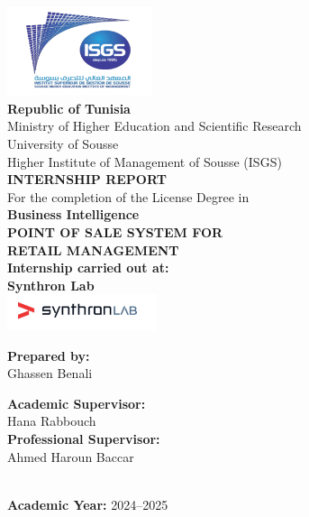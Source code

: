 \begin{titlepage}
    \begin{center}

        \vspace*{1em}
        \includegraphics[width=0.32\textwidth]{figures/logos/isgs-logo.png}\\[2em]

        \textbf{\large Republic of Tunisia}\\
        Ministry of Higher Education and Scientific Research\\
        University of Sousse\\
        Higher Institute of Management of Sousse (ISGS)\\[3em]

        \textbf{\Large INTERNSHIP REPORT}\\[1em]
        For the completion of the License Degree in\\
        \textbf{Business Intelligence}\\[2.5em]

        {\huge \textbf{POINT OF SALE SYSTEM FOR}}\\[0.3em]
        
        {\huge \textbf{RETAIL MANAGEMENT}}\\[3em]

        \textbf{Internship carried out at:}\\
        \textbf{Synthron Lab}\\[1em]

        \includegraphics[width=0.33\textwidth]{figures/logos/synthronlab-logo.png}\\[4em]

        \begin{minipage}[t]{0.45\textwidth}
            \raggedright
            \textbf{Prepared by:}\\
            {\large Ghassen Benali}
        \end{minipage}
        \hfill
        \begin{minipage}[t]{0.45\textwidth}
            \raggedleft
            \textbf{Academic Supervisor:}\\
            {\large Hana Rabbouch}\\[1em]
            \textbf{Professional Supervisor:}\\
            {\large Ahmed Haroun Baccar}
        \end{minipage}\\[4em]

        \textbf{Academic Year:} 2024–2025

    \end{center}
\end{titlepage}
